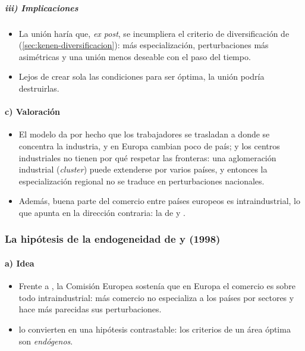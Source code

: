 \documentclass[11pt]{article}
\begin{document}
\subparagraph{iii) Implicaciones}

\begin{itemize}
\item La unión haría que, \emph{ex post}, se incumpliera el criterio de diversificación de  (\ref{sec:kenen-diversificacion}): más especialización, perturbaciones más asimétricas y una unión menos deseable con el paso del tiempo.
\item Lejos de crear sola las condiciones para ser óptima, la unión podría destruirlas.
\end{itemize}

\paragraph{c) Valoración}

\begin{itemize}
\item El modelo da por hecho que los trabajadores se trasladan a donde se concentra la industria, y en Europa cambian poco de país; y los centros industriales no tienen por qué respetar las fronteras: una aglomeración industrial (\emph{cluster}) puede extenderse por varios países, y entonces la especialización regional no se traduce en perturbaciones nacionales\nocite{DeGrauwe2022Economics}.
\item Además, buena parte del comercio entre países europeos es intraindustrial, lo que apunta en la dirección contraria: la de  y .
\end{itemize}

\subsubsection{La hipótesis de la endogeneidad de  y  (1998)}\label{sec:frankel-rose}

\paragraph{a) Idea}

\begin{itemize}
\item Frente a , la Comisión Europea sostenía que en Europa el comercio es sobre todo intraindustrial: más comercio no especializa a los países por sectores y hace más parecidas sus perturbaciones\nocite{CE1990OneMarket}.
\item \textcite{FrankelRose1998Endogeneity} lo convierten en una hipótesis contrastable: los criterios de un área óptima son \emph{endógenos}.
\end{itemize}
\end{document}
